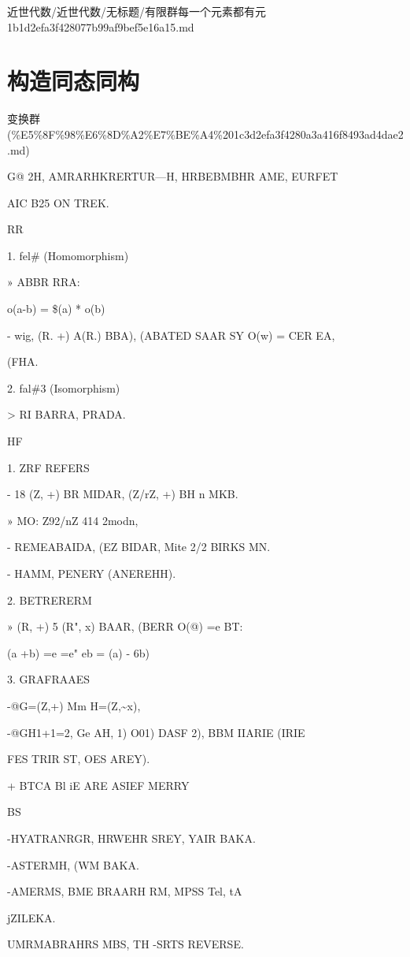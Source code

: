\begin{note}[来源路径]

近世代数/近世代数/无标题/有限群每一个元素都有元 1b1d2efa3f428077b99af9bef5e16a15.md

\end{note}

\section*{构造同态同构}

\begin{note}[来源上级主题]

变换群 (\%E5\%8F\%98\%E6\%8D\%A2\%E7\%BE\%A4\%201c3d2efa3f4280a3a416f8493ad4dae2.md)

\end{note}

\begin{note}[构造同态同构]

G@ 2H, AMRARHKRERTUR—H, HRBEBMBHR AME, EURFET

AIC B25 ON TREK.

RR

1. fel\# (Homomorphism)

» ABBR RRA:

o(a-b) = \$(a) * o(b)

- wig, (R. +) A(R.) BBA), (ABATED SAAR SY O(w) = CER EA,

(FHA.

2. fal\#3 (Isomorphism)

> RI BARRA, PRADA.

HF

1. ZRF REFERS

- 18 (Z, +) BR MIDAR, (Z/rZ, +) BH n MKB.

» MO: Z92/nZ 414 2modn,

- REMEABAIDA, (EZ BIDAR, Mite 2/2 BIRKS MN.

- HAMM, PENERY (ANEREHH).

2. BETRERERM

» (R, +) 5 (R", x) BAAR, (BERR O(@) =e BT:

(a +b) =e =e" eb = (a) - 6b)

3. GRAFRAAES

-@G=(Z,+) Mm H=(Z,\textasciitilde{}x),

-@GH1+1=2, Ge AH, 1) O01) DASF 2), BBM IIARIE (IRIE

FES TRIR ST, OES AREY).

+ BTCA Bl iE ARE ASIEF MERRY

BS

-HYATRANRGR, HRWEHR SREY, YAIR BAKA.

-ASTERMH, (WM BAKA.

-AMERMS, BME BRAARH RM, MPSS Tel, tA

jZILEKA.

UMRMABRAHRS MBS, TH -SRTS REVERSE.

\end{note}

